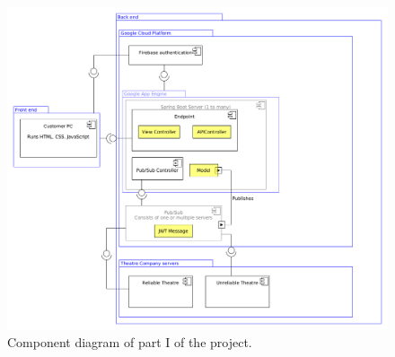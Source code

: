 \documentclass{ds-report}
\begin{document}
	
	\begin{figure}
		\begin{center}
			\includegraphics[width=\linewidth]{../diagrams/ComponentDiagram}
		\end{center}
	\caption{Component diagram of part I of the project.}
	\label{fig:component}
	\end{figure}

	
\end{document}
